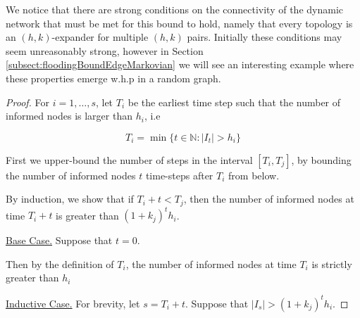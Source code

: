 
We notice that there are strong conditions on the connectivity of the dynamic network that must be met for this bound to hold, namely that every topology is an $(h,k)$-expander for multiple $(h, k)$ pairs. Initially these conditions may seem unreasonably strong, however in Section \ref{subsect:floodingBoundEdgeMarkovian} we will see an interesting example where these properties emerge w.h.p in a random graph.

\begin{proof}
	For $i = 1,\dots, s$, let $T_i$ be the earliest time step such that the number of informed nodes is larger than $h_i$, i.e

	$$
		T_i = \min \{ t \in \mathbb{N} : |I_t| > h_i \}
	$$

	First we upper-bound the number of steps in the interval $[T_i, T_j]$, %
	by bounding the number of informed nodes $t$ time-steps after $T_i$ from below.

	By induction, we show that if $T_i + t < T_j$, then the number of informed nodes at time $T_i + t$ is greater than $(1+k_j)^t h_i$.
	
	\underline{Base Case.} Suppose that $t=0$. 
	
	Then by the definition of $T_i$, the number of informed nodes at time $T_i$ is strictly greater than $h_i$

	\underline{Inductive Case.} For brevity, let $s = T_i + t$. Suppose that $|I_s| > (1+k_j)^t h_i$.


\end{proof}

